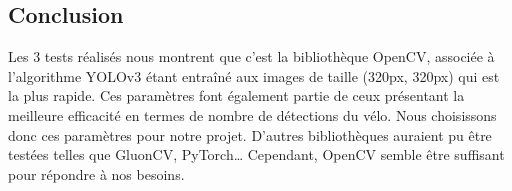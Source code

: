 \subsection{Conclusion}
\label{sec:comparaisonIA:conclusion}

Les 3 tests réalisés nous montrent que c'est la bibliothèque OpenCV,
associée à l'algorithme YOLOv3 étant entraîné aux images de taille (320px, 320px) qui est la plus rapide.
Ces paramètres font également partie de ceux présentant la meilleure efficacité en termes de nombre de détections du vélo.
Nous choisissons donc ces paramètres pour notre projet.
D'autres bibliothèques auraient pu être testées telles que GluonCV, PyTorch\dots
Cependant, OpenCV semble être suffisant pour répondre à nos besoins.
